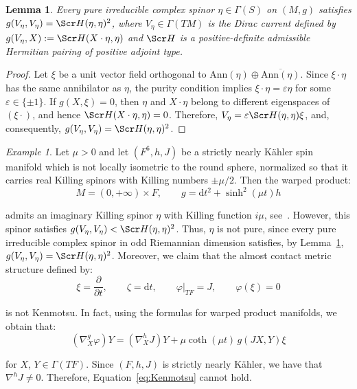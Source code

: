 \documentclass[10pt,a4paper,twoside,reqno]{amsart}
\theoremstyle{plain}
\newtheorem{lemma}[thm]{Lemma}
\theoremstyle{definition}
\theoremstyle{remark}
\newtheorem{example}[thm]{Example}
\def\scS{\Scr H}
\begin{document}
\begin{lemma}\label{lemma:pure-implies-type-I}
Every pure irreducible complex spinor $\eta \in \Gamma (S)$ on $(M,g)$ satisfies $g(V_\eta,V_\eta) = \scS(\eta,\eta)^2$, where $V_\eta\in\Gamma(TM)$ is the Dirac current defined by $g(V_\eta, X) := \scS(X \cdot \eta, \eta)$ and $\scS$ is a positive-definite admissible Hermitian pairing of positive adjoint type.
\end{lemma}

\begin{proof}
Let $\xi$ be a unit vector field orthogonal to $\mathrm{Ann}(\eta)\oplus\overline{\mathrm{Ann}(\eta)}$. Since $\xi\cdot\eta$ has the same annihilator as $\eta$, the purity condition implies $\xi\cdot\eta=\varepsilon \eta$ for some $\varepsilon\in\{\pm1\}$. If $g(X,\xi)=0$, then $\eta$ and $X\cdot\eta$ belong to different eigenspaces of $(\xi\cdot)$, and hence $\scS(X\cdot\eta,\eta)=0$. Therefore, $V_\eta=\varepsilon\scS(\eta,\eta)\xi$, and, consequently, $g(V_\eta,V_\eta) = \scS(\eta,\eta)^2$.
\end{proof}

\begin{example}
\label{ex:non-pure-example}
Let $\mu>0$ and let $(F^6,h,J)$ be a strictly nearly Kähler spin manifold which is not locally isometric to the round sphere, normalized so that it carries real Killing spinors with Killing numbers $\pm\mu/2$. Then the warped product:
\begin{equation*}
M=(0,+\infty)\times F,  \qquad g=\mathrm{d}t^2+\sinh^2(\mu t)h
\end{equation*}

\noindent
admits an imaginary Killing spinor $\eta$ with Killing function $i\mu$, see~\cite[Ex.~3.2]{C2026}. However, this spinor satisfies $g(V_\eta,V_\eta)<\scS(\eta,\eta)^2$. Thus, $\eta$ is not pure, since every pure irreducible complex spinor in odd Riemannian dimension satisfies, by Lemma~\ref{lemma:pure-implies-type-I}, $g(V_\eta,V_\eta) = \scS(\eta,\eta)^2$. Moreover, we claim that the almost contact metric structure defined by:
\begin{equation*}
\xi= \frac{\partial}{\partial t}, \qquad \zeta=\mathrm{d}t, \qquad \varphi|_{TF}=J,\qquad \varphi(\xi)=0
\end{equation*}

\noindent
is not Kenmotsu. In fact, using the formulas for warped product manifolds, we obtain that:
\begin{equation*}
(\nabla_X^g\varphi)Y = (\nabla_X^hJ)Y + \mu\coth(\mu t)\,g(JX,Y)\xi
\end{equation*}

\noindent
for $X$, $Y\in\Gamma(TF)$. Since $(F,h,J)$ is strictly nearly Kähler, we have that $\nabla^hJ\neq0$. Therefore, Equation~\eqref{eq:Kenmotsu} cannot hold.
\end{example}
\end{document}
